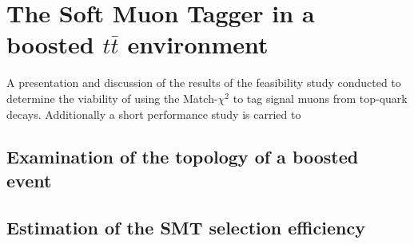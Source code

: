 \chapter{The Soft Muon Tagger in a boosted $t\bar{t}$ environment} \label{sec:boosted_study}
A presentation and discussion of the results of the feasibility study conducted
to determine the viability of using the Match-$\chi^{2}$ to tag signal muons from top-quark decays.
Additionally a short performance study is carried to
\section{Examination of the topology of a boosted event}
\section{Estimation of the SMT selection efficiency}
